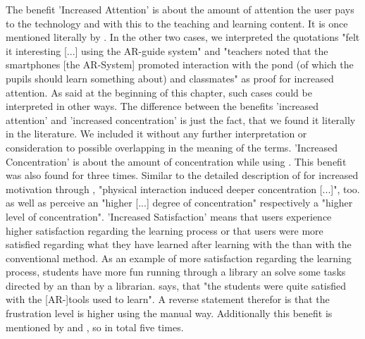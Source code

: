 The benefit 'Increased Attention' is about the amount of attention the user pays to the technology and with this to the teaching and learning content. It is once mentioned literally by \cite{VateULan.2012}.\autocite[cf.][894]{VateULan.2012} In the other two cases, we interpreted the quotations "felt it interesting [...] using the AR-guide system"\autocite[194]{Chen.2008} and 
"teachers noted that the smartphones [the AR-System] promoted interaction with the pond (of which the pupils should learn something about) and classmates"\autocite[552]{Kamarainen.2013} as proof for 
increased attention. As said at the beginning of this chapter, such cases could be interpreted in other ways.
The difference between the benefits 'increased attention' and 'increased concentration' is just the fact, that we found it literally in the literature. We included it
without any further interpretation or consideration to possible overlapping in the meaning of the terms.
'Increased Concentration' is about the amount of concentration while using \AR \appsns. This benefit was also found for three times. Similar to the detailed description of \cite{Iwata.2011} for increased motivation through \AR \appns, "physical interaction
induced deeper concentration [...]"\autocite[9]{Iwata.2011}, too. \cite{Yen.2013} as well as \cite{Ibanez.2014} perceive an "higher [...] degree of concentration"\autocite[173]{Yen.2013} respectively a 
"higher level of concentration"\autocite[11]{Ibanez.2014}. 
'Increased Satisfaction' means that users experience higher satisfaction regarding the learning process or that users were more satisfied regarding what they have learned after learning with the \AR \app than with the 
conventional method. As an example of more satisfaction regarding the learning process, students have more fun running through a library an solve some tasks directed by an \AR \app than by a librarian\autocite[649]{Chen.2012}.
\cite{MartinGutierrez.2013} says, that "the students were quite satisfied with the [AR-]tools used to learn"\autocite[6]{MartinGutierrez.2013}. A reverse statement therefor is that the frustration level is higher using the 
manual way\autocite[cf.][448]{Hou.2013}. Additionally this benefit is mentioned by \cite{Ibanez.2014} and \cite{Redondo.2013}, so in total five times.

% 
